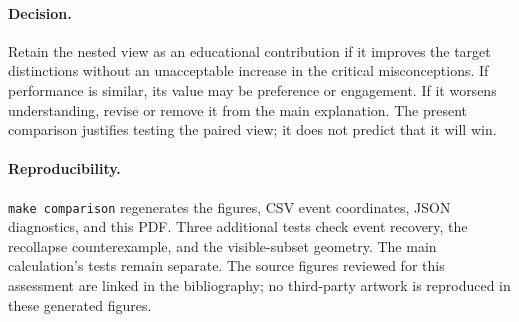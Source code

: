 \documentclass[11pt,a4paper]{article}
\begin{document}
\paragraph{Decision.}
Retain the nested view as an educational contribution if it improves the
target distinctions without an unacceptable increase in the critical
misconceptions. If performance is similar, its value may be preference
or engagement. If it worsens understanding, revise or remove it from the
main explanation. The present comparison justifies testing the paired
view; it does not predict that it will win.

\paragraph{Reproducibility.}
\texttt{make comparison} regenerates the figures, CSV event coordinates,
JSON diagnostics, and this PDF. Three additional tests check event recovery,
the recollapse counterexample, and the visible-subset geometry. The main
calculation's tests remain separate. The source figures reviewed for this
assessment are linked in the bibliography; no third-party artwork is
reproduced in these generated figures.

\clearpage


\end{document}

